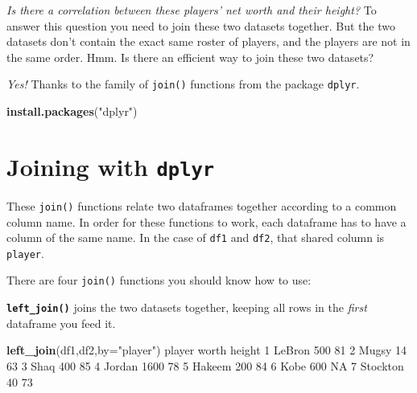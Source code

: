 \documentclass[
]{book}
\newenvironment{Shaded}{\begin{snugshade}}{\end{snugshade}}
\newcommand{\DataTypeTok}[1]{\textcolor[rgb]{0.13,0.29,0.53}{#1}}
\newcommand{\DecValTok}[1]{\textcolor[rgb]{0.00,0.00,0.81}{#1}}
\newcommand{\KeywordTok}[1]{\textcolor[rgb]{0.13,0.29,0.53}{\textbf{#1}}}
\newcommand{\NormalTok}[1]{#1}
\newcommand{\OtherTok}[1]{\textcolor[rgb]{0.56,0.35,0.01}{#1}}
\newcommand{\StringTok}[1]{\textcolor[rgb]{0.31,0.60,0.02}{#1}}
\begin{document}
\emph{Is there a correlation between these players' net worth and their height?} To answer this question you need to join these two datasets together. But the two datasets don't contain the exact same roster of players, and the players are not in the same order. Hmm. Is there an efficient way to join these two datasets?

\emph{Yes!} Thanks to the family of \texttt{join()} functions from the package \texttt{dplyr}.

\begin{Shaded}
\begin{Highlighting}[]
\KeywordTok{install.packages}\NormalTok{(}\StringTok{"dplyr"}\NormalTok{)}
\end{Highlighting}
\end{Shaded}

\hypertarget{joining-with-dplyr}{%
\section*{\texorpdfstring{Joining with \texttt{dplyr}}{Joining with dplyr}}\label{joining-with-dplyr}}

These \texttt{join()} functions relate two dataframes together according to a common column name. In order for these functions to work, each dataframe has to have a column of the same name. In the case of \texttt{df1} and \texttt{df2}, that shared column is \texttt{player}.

There are four \texttt{join()} functions you should know how to use:

\textbf{\texttt{left\_join()}} joins the two datasets together, keeping all rows in the \emph{first} dataframe you feed it.

\begin{Shaded}
\begin{Highlighting}[]
\KeywordTok{left_join}\NormalTok{(df1,df2,}\DataTypeTok{by=}\StringTok{"player"}\NormalTok{)}
\NormalTok{    player worth height}
\DecValTok{1}\NormalTok{   LeBron   }\DecValTok{500}     \DecValTok{81}
\DecValTok{2}\NormalTok{    Mugsy    }\DecValTok{14}     \DecValTok{63}
\DecValTok{3}\NormalTok{     Shaq   }\DecValTok{400}     \DecValTok{85}
\DecValTok{4}\NormalTok{   Jordan  }\DecValTok{1600}     \DecValTok{78}
\DecValTok{5}\NormalTok{   Hakeem   }\DecValTok{200}     \DecValTok{84}
\DecValTok{6}\NormalTok{     Kobe   }\DecValTok{600}     \OtherTok{NA}
\DecValTok{7}\NormalTok{ Stockton    }\DecValTok{40}     \DecValTok{73}
\end{Highlighting}
\end{Shaded}
\end{document}
